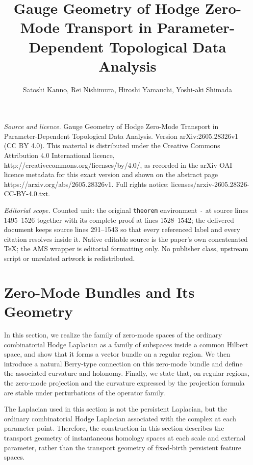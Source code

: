 \documentclass[10pt,a4paper]{amsart}
\begin{document}
\title[Gauge Geometry of Hodge Zero-Mode Transport in Parameter-Dep]{Gauge Geometry of Hodge Zero-Mode Transport in Parameter-Dependent Topological Data Analysis}
\author{Satoshi Kanno, Rei Nishimura, Hiroshi Yamauchi, Yoshi-aki Shimada}
\date{}
\maketitle
\noindent\emph{Source and licence.} Gauge Geometry of Hodge Zero-Mode Transport in Parameter-Dependent Topological Data Analysis. Version arXiv:2605.28326v1 (CC BY 4.0). This material is distributed under the Creative Commons Attribution 4.0 International licence, http://creativecommons.org/licenses/by/4.0/, as recorded in the arXiv OAI licence metadata for this exact version and shown on the abstract page https://arxiv.org/abs/2605.28326v1. Full rights notice: licenses/arxiv-2605.28326-CC-BY-4.0.txt.\par\smallskip
\noindent\textit{Editorial scope.} Counted unit: the original \texttt{theorem} environment \texttt{-} at source lines 1495--1526 together with its complete proof at lines 1528--1542; the delivered document keeps source lines 291--1543 so that every referenced label and every citation resolves inside it. Native editable source is the paper's own concatenated TeX; the AMS wrapper is editorial formatting only. No publisher class, upstream script or unrelated artwork is redistributed.
\section{Zero-Mode Bundles and Its Geometry}

In this section, we realize the family of zero-mode spaces of the ordinary combinatorial Hodge Laplacian as a family of subspaces inside a common Hilbert space, and show that it forms a vector bundle on a regular region. We then introduce a natural Berry-type connection on this zero-mode bundle and define the associated curvature and holonomy. Finally, we state that, on regular regions, the zero-mode projection and the curvature expressed by the projection formula are stable under perturbations of the operator family.

The Laplacian used in this section is not the persistent Laplacian, but the ordinary combinatorial Hodge Laplacian associated with the complex at each parameter point. Therefore, the construction in this section describes the transport geometry of instantaneous homology spaces at each scale and external parameter, rather than the transport geometry of fixed-birth persistent feature spaces.
\end{document}

